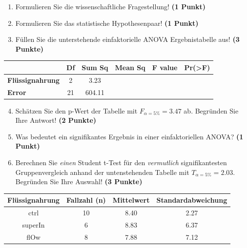 \documentclass[a4paper, 9pt]{scrartcl}\usepackage[]{graphicx}\usepackage[]{xcolor}
\newenvironment{knitrout}{}{} %
\begin{document}
\begin{enumerate}
  \item Formulieren Sie die wissenschaftliche Fragestellung! \textbf{(1 Punkt)}
  \item Formulieren Sie das statistische Hypothesenpaar! \textbf{(1 Punkt)}
\item Füllen Sie die unterstehende einfaktorielle ANOVA Ergebnistabelle aus! \textbf{(3 Punkte)}
\end{enumerate}

\vspace{1Ex}

\begin{center}
  \Large
  \begin{tabular}{lccccp{3cm}}
\toprule
     & \textbf{Df} & \textbf{Sum Sq} & \textbf{Mean Sq} & \textbf{F value} & \textbf{Pr(>F)} \strut\\
    \midrule
   \textbf{Flüssignahrung}  & 2 & 3.23 &  &  &  \strut\\
   \textbf{Error}  & 21 & 604.11 &  &  &  \strut\\
\bottomrule
  \end{tabular}
\end{center}

\vspace{1Ex}

\begin{enumerate}
  \setcounter{enumi}{3}
\item Schätzen Sie den p-Wert der Tabelle mit $F_{\alpha = 5\%} = 3.47$ ab. Begründen Sie Ihre Antwort! \textbf{(2 Punkte)}
\item Was bedeutet ein signifikantes Ergebnis in einer einfaktoriellen ANOVA? \textbf{(1 Punkt)}
\item Berechnen Sie \textit{einen} Student t-Test für den \textit{vermutlich} signifikantesten Gruppenvergleich anhand der untenstehenden Tabelle mit $T_{\alpha = 5\%} = 2.03$. Begründen Sie Ihre Auswahl! \textbf{(3 Punkte)}
\end{enumerate}


\begin{knitrout}
\color{fgcolor}\begin{table}[!h]
\centering\begingroup\fontsize{11}{13}\selectfont

\begin{tabular}{cccc}
\toprule
\textbf{Flüssignahrung} & \textbf{Fallzahl (n)} & \textbf{Mittelwert} & \textbf{Standardabweichung}\\
\midrule
ctrl & 10 & 8.40 & 2.27\\
superIn & 6 & 8.83 & 6.37\\
flOw & 8 & 7.88 & 7.12\\
\bottomrule
\end{tabular}
\endgroup{}
\end{table}

\end{knitrout}
\end{document}
